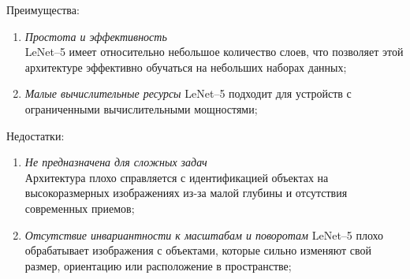 Преимущества:
\begin{enumerate}
\item \textit{Простота и эффективность} \\
LeNet--5 имеет относительно небольшое количество слоев, что позволяет этой архитектуре эффективно обучаться на небольших наборах данных;

\item \textit{Малые вычислительные ресурсы}
LeNet--5 подходит для устройств с ограниченными вычислительными мощностями;
\end{enumerate}

Недостатки:
\begin{enumerate}
\item \textit{Не предназначена для сложных задач} \\
Архитектура плохо справляется с идентификацией объектах на высокоразмерных изображениях из-за малой глубины и отсутствия современных приемов;

\item \textit{Отсутствие инвариантности к масштабам и поворотам}
LeNet--5 плохо обрабатывает изображения с объектами, которые сильно изменяют свой размер, ориентацию или расположение в пространстве;
\end{enumerate}

